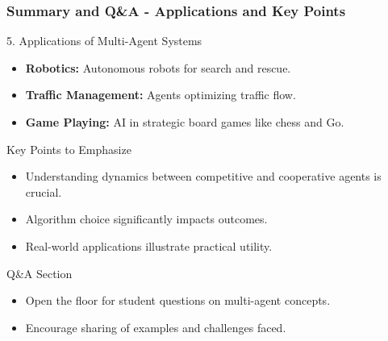 \documentclass[aspectratio=169]{beamer}
\begin{document}
\begin{frame}[fragile]
    \frametitle{Summary and Q\&A - Applications and Key Points}

    \begin{block}{5. Applications of Multi-Agent Systems}
        \begin{itemize}
            \item \textbf{Robotics:} Autonomous robots for search and rescue.
            \item \textbf{Traffic Management:} Agents optimizing traffic flow.
            \item \textbf{Game Playing:} AI in strategic board games like chess and Go.
        \end{itemize}
    \end{block}

    \begin{block}{Key Points to Emphasize}
        \begin{itemize}
            \item Understanding dynamics between competitive and cooperative agents is crucial.
            \item Algorithm choice significantly impacts outcomes.
            \item Real-world applications illustrate practical utility.
        \end{itemize}
    \end{block}

    \begin{block}{Q\&A Section}
        \begin{itemize}
            \item Open the floor for student questions on multi-agent concepts.
            \item Encourage sharing of examples and challenges faced.
        \end{itemize}
    \end{block}
\end{frame}
\end{document}
